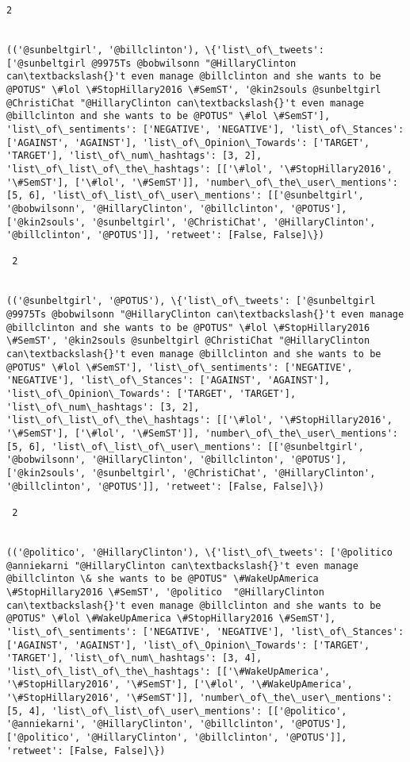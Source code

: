 \documentclass[11pt]{article}
\begin{document}
\begin{Verbatim}[commandchars=\\\{\}]
 2
 

(('@sunbeltgirl', '@billclinton'), \{'list\_of\_tweets': ['@sunbeltgirl @9975Ts @bobwilsonn "@HillaryClinton can\textbackslash{}'t even manage @billclinton and she wants to be @POTUS" \#lol \#StopHillary2016 \#SemST', '@kin2souls @sunbeltgirl @ChristiChat "@HillaryClinton can\textbackslash{}'t even manage @billclinton and she wants to be @POTUS" \#lol \#SemST'], 'list\_of\_sentiments': ['NEGATIVE', 'NEGATIVE'], 'list\_of\_Stances': ['AGAINST', 'AGAINST'], 'list\_of\_Opinion\_Towards': ['TARGET', 'TARGET'], 'list\_of\_num\_hashtags': [3, 2], 'list\_of\_list\_of\_the\_hashtags': [['\#lol', '\#StopHillary2016', '\#SemST'], ['\#lol', '\#SemST']], 'number\_of\_the\_user\_mentions': [5, 6], 'list\_of\_list\_of\_user\_mentions': [['@sunbeltgirl', '@bobwilsonn', '@HillaryClinton', '@billclinton', '@POTUS'], ['@kin2souls', '@sunbeltgirl', '@ChristiChat', '@HillaryClinton', '@billclinton', '@POTUS']], 'retweet': [False, False]\})

 2
 

(('@sunbeltgirl', '@POTUS'), \{'list\_of\_tweets': ['@sunbeltgirl @9975Ts @bobwilsonn "@HillaryClinton can\textbackslash{}'t even manage @billclinton and she wants to be @POTUS" \#lol \#StopHillary2016 \#SemST', '@kin2souls @sunbeltgirl @ChristiChat "@HillaryClinton can\textbackslash{}'t even manage @billclinton and she wants to be @POTUS" \#lol \#SemST'], 'list\_of\_sentiments': ['NEGATIVE', 'NEGATIVE'], 'list\_of\_Stances': ['AGAINST', 'AGAINST'], 'list\_of\_Opinion\_Towards': ['TARGET', 'TARGET'], 'list\_of\_num\_hashtags': [3, 2], 'list\_of\_list\_of\_the\_hashtags': [['\#lol', '\#StopHillary2016', '\#SemST'], ['\#lol', '\#SemST']], 'number\_of\_the\_user\_mentions': [5, 6], 'list\_of\_list\_of\_user\_mentions': [['@sunbeltgirl', '@bobwilsonn', '@HillaryClinton', '@billclinton', '@POTUS'], ['@kin2souls', '@sunbeltgirl', '@ChristiChat', '@HillaryClinton', '@billclinton', '@POTUS']], 'retweet': [False, False]\})

 2
 

(('@politico', '@HillaryClinton'), \{'list\_of\_tweets': ['@politico @anniekarni "@HillaryClinton can\textbackslash{}'t even manage @billclinton \& she wants to be @POTUS" \#WakeUpAmerica \#StopHillary2016 \#SemST', '@politico  "@HillaryClinton can\textbackslash{}'t even manage @billclinton and she wants to be @POTUS" \#lol \#WakeUpAmerica \#StopHillary2016 \#SemST'], 'list\_of\_sentiments': ['NEGATIVE', 'NEGATIVE'], 'list\_of\_Stances': ['AGAINST', 'AGAINST'], 'list\_of\_Opinion\_Towards': ['TARGET', 'TARGET'], 'list\_of\_num\_hashtags': [3, 4], 'list\_of\_list\_of\_the\_hashtags': [['\#WakeUpAmerica', '\#StopHillary2016', '\#SemST'], ['\#lol', '\#WakeUpAmerica', '\#StopHillary2016', '\#SemST']], 'number\_of\_the\_user\_mentions': [5, 4], 'list\_of\_list\_of\_user\_mentions': [['@politico', '@anniekarni', '@HillaryClinton', '@billclinton', '@POTUS'], ['@politico', '@HillaryClinton', '@billclinton', '@POTUS']], 'retweet': [False, False]\})


\end{Verbatim}
\end{document}

